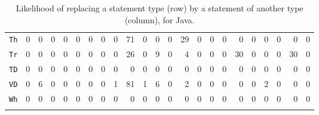 \begin{table*}
{\begin{tabular}{l|rrrrrrrrrrrrrrrrrrrrrr}
\texttt{Th}	&0&	0&	0&	0&	0&	0&	0&	0&	71&	0&	0&	0&	29&	0&	0&	0&	0&	0&	0&	0&	0&	0\\
\texttt{Tr}	&0&	0&	0&	0&	0&	0&	0&	0&	26&	0&	9&	0&	4&	0&	0&	0&	30&	0&	0&	0&	30&	0\\
\texttt{TD}	&0&	0&	0&	0&	0&	0&	0&	0&	0&	0&	0&	0&	0&	0&	0&	0&	0&	0&	0&	0&	0&	0\\
\texttt{VD}	&0&	6&	0&	0&	0&	0&	0&	1&	81&	1&	6&	0&	2&	0&	0&	0&	0&	0&	2&	0&	0&	0\\
\texttt{Wh}	&0&	0&	0&	0&	0&	0&	0&	0&	0&	0&	0&	0&	0&	0&	0&	0&	0&	0&	0&	0&	0&	0\\
			\\ \bottomrule
		\end{tabular}
		}
		\caption{Likelihood of replacing a statement type (row) by a statement of
          another type (column), for Java.}\label{tab:likeliness}
\end{table*}

